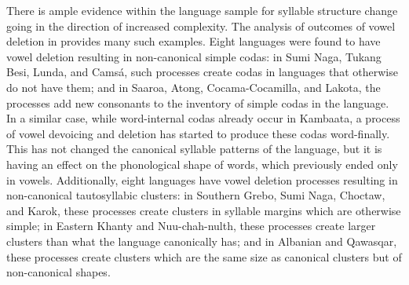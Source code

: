   There is ample evidence within the language sample for syllable structure change going in the direction of increased complexity. The analysis of outcomes of vowel deletion in  provides many such examples. Eight languages were found to have vowel deletion resulting in non-canonical simple codas: in Sumi Naga, Tukang Besi, Lunda, and Camsá, such processes create codas in languages that otherwise do not have them; and in Saaroa, Atong, Cocama-Cocamilla, and Lakota, the processes add new consonants to the inventory of simple codas in the language. In a similar case, while word-internal codas already occur in Kambaata, a process of vowel devoicing and deletion has started to produce these codas word-finally. This has not changed the canonical syllable patterns of the language, but it is having an effect on the phonological shape of words, which previously ended only in vowels. Additionally, eight languages have vowel deletion processes resulting in non-canonical tautosyllabic clusters: in Southern Grebo, Sumi Naga, Choctaw, and Karok, these processes create clusters in syllable margins which are otherwise simple; in Eastern Khanty and Nuu-chah-nulth, these processes create larger clusters than what the language canonically has; and in Albanian and Qawasqar, these processes create clusters which are the same size as canonical clusters but of non-canonical shapes.

